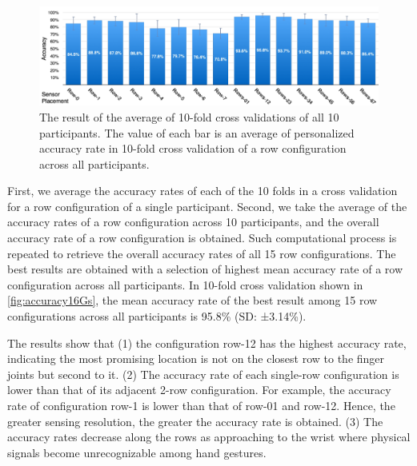 \documentclass{sigchi}
\begin{document}
\begin{figure}
 \begin{center}
  \includegraphics[width=2\columnwidth]{figures/10FCV_16_v2.pdf}
  \caption{
    The result of the average of 10-fold cross validations of all 10 participants. The value of each bar is an average of personalized accuracy rate in 10-fold cross validation of a row configuration across all participants.
  }
  \label{fig:accuracy16Gs}
  \end{center}
\end{figure}
First, we average the accuracy rates of each of the 10 folds in a cross validation for a row configuration of a single participant.
Second, we take the average of the accuracy rates of a row configuration across 10 participants, and the overall accuracy rate of a row configuration is obtained.
Such computational process is repeated to retrieve the overall accuracy rates of all 15 row configurations.
The best results are obtained with a selection of highest mean accuracy rate of a row configuration across all participants.
In 10-fold cross validation shown in \autoref{fig:accuracy16Gs}, the mean accuracy rate of the best result among 15 row configurations across all participants is 95.8\% (SD: ±3.14\%).

The results show that
(1) the configuration row-12 has the highest accuracy rate, indicating the most promising location is not on the closest row to the finger joints but second to it. 
(2) The accuracy rate of each single-row configuration is lower than that of its adjacent 2-row configuration. For example, the accuracy rate of configuration row-1 is lower than that of row-01 and row-12. Hence, the greater sensing resolution, the greater the accuracy rate is obtained. 
(3) The accuracy rates decrease along the rows as approaching to the wrist where physical signals become unrecognizable among hand gestures.
\end{document}
